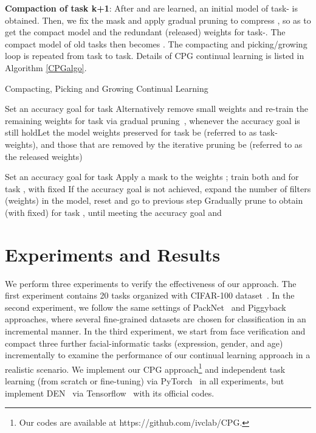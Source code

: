 \documentclass{article}
\begin{document}
\noindent\textbf{Compaction of task k+1}: After  and  are learned, an initial model of task- is obtained.
Then, we fix the mask  and apply gradual pruning to compress , so as to get the compact model  and the redundant (released) weights  for task-.
The compact model of old tasks then becomes .
The compacting and picking/growing loop is repeated from task to task.
Details of CPG continual learning is listed in Algorithm \ref{CPGalgo}.








\vspace{-5pt}
\begin{algorithm}[h]
\small
\caption{Compacting, Picking and Growing Continual Learning }
\label{CPGalgo}
Set an accuracy goal for task \;
Alternatively remove small weights and re-train the remaining weights for task  via gradual pruning~\cite{h.2018to}, whenever the accuracy goal is still hold\;Let the model weights preserved for task  be  (referred to as task- weights), and those that are removed by the iterative pruning be  (referred to as the released weights)\;

{
    Set an accuracy goal for task \;
    Apply a mask  to the weights ; train both  and  for task , with  fixed\;
    If the accuracy goal is not achieved, expand the number of filters (weights) in the model, reset  and go to previous step\;
    Gradually prune  to obtain  (with  fixed) for task , until meeting the accuracy goal\;
     and \;
}

\end{algorithm}

\section{Experiments and Results}


We perform three experiments to verify the effectiveness of our approach.
The first experiment contains 20 tasks organized with CIFAR-100 dataset~\cite{Krizhevsky09learningmultiple}. In the second experiment, we follow the same settings of PackNet~\cite{mallya2018packnet} and Piggyback~\cite{Mallya2018PiggybackAA} approaches, where several fine-grained datasets are chosen for classification in an incremental manner.
In the third experiment, we start from face verification and compact three further facial-informatic tasks (expression, gender, and age) incrementally to examine the performance of our continual learning approach in a realistic scenario.
We implement our CPG approach\footnote{Our codes are available at https://github.com/ivclab/CPG.} and independent task learning (from scratch or fine-tuning) via PyTorch~\cite{paszke2017pytorch} in all experiments, but implement DEN~\cite{ostapenko2019learning} via Tensorflow~\cite{abadi2016tensorflow} with its official codes.
\end{document}
